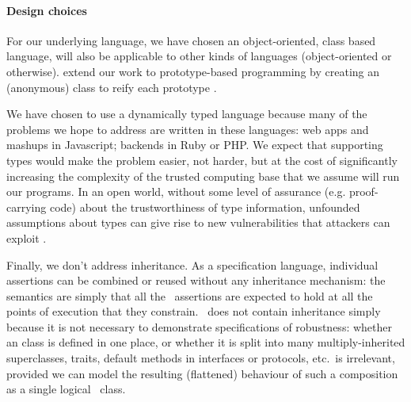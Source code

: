 
\paragraph{Design choices}

For our underlying language, we have chosen an object-oriented, class based language,
 will also be
applicable to other kinds of languages (object-oriented or
otherwise).
 extend our work to prototype-based programming
by creating an (anonymous) class to reify each
prototype \cite{graceClasses}. 

We have chosen to use a dynamically typed language because many of the
problems we hope to address are written in these
languages: web apps and mashups in Javascript; backends in Ruby or
PHP.  We expect that supporting types would make the problem easier,
not harder, but at the cost of significantly increasing the complexity
of the trusted computing base that we assume will run our programs. In
an open world, without some level of assurance (e.g. proof-carrying
code) about the trustworthiness of type information, unfounded
assumptions about types can give rise to new vulnerabilities that
attackers can exploit \cite{pickles}.

Finally, we don't address inheritance. As a specification language,
individual \Chainmail assertions can be combined or reused without any
inheritance mechanism: the semantics are simply that all
the \Chainmail\ assertions are expected to hold at all the points of
execution that they constrain.  \LangOO\ does not contain inheritance
simply because it is not necessary to demonstrate specifications of
robustness: whether an \LangOO class is defined in one place, or
whether it is split into many multiply-inherited superclasses, traits,
default methods in interfaces or protocols, etc.\ is irrelevant,
provided we can model the resulting (flattened) behaviour of such a
composition as a single logical \LangOO\ class.

